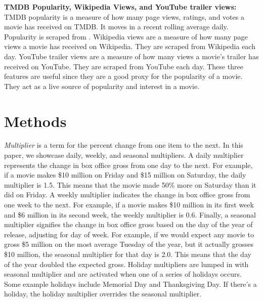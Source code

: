 \documentclass[12pt]{article}
\begin{document}
\textbf{TMDB Popularity, Wikipedia Views, and YouTube trailer views:} TMDB popularity is a measure of how many page views, ratings, and votes a movie has received on TMDB. It moves in a recent rolling average daily. Popularity is scraped from \citep{tmdbPopularity}. Wikipedia views are a measure of how many page views a movie has received on Wikipedia. They are scraped from Wikipedia \citep{wikipediaPageViews} each day. YouTube trailer views are a measure of how many views a movie's trailer has received on YouTube. They are scraped from YouTube \citep{youtubeHome} each day. These three features are useful since they are a good proxy for the popularity of a movie. They act as a live source of popularity and interest in a movie.

\section{Methods} \label{sec:methods}

\textit{Multiplier} is a term for the percent change from one item to the next. In this paper, we showcase daily, weekly, and seasonal multipliers. A daily multiplier represents the change in box office gross from one day to the next. For example, if a movie makes \$10 million on Friday and \$15 million on Saturday, the daily multiplier is 1.5. This means that the movie made 50\% more on Saturday than it did on Friday. A weekly multiplier indicates the change in box office gross from one week to the next. For example, if a movie makes \$10 million in its first week and \$6 million in its second week, the weekly multiplier is 0.6. Finally, a seasonal multiplier signifies the change in box office gross based on the day of the year of release, adjusting for day of week. For example, if we would expect any movie to gross \$5 million on the most average Tuesday of the year, but it actually grosses \$10 million, the seasonal multiplier for that day is 2.0. This means that the day of the year doubled the expected gross. Holiday multipliers are lumped in with seasonal multiplier and are activated when one of a series of holidays occurs. Some example holidays include Memorial Day and Thanksgiving Day. If there's a holiday, the holiday multiplier overrides the seasonal multiplier.
\end{document}

